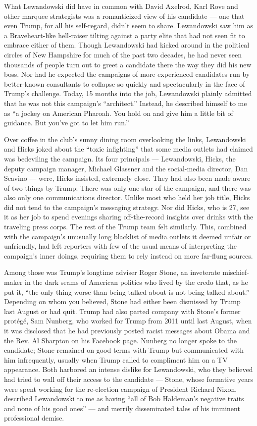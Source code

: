 What Lewandowski did have in common with David Axelrod, Karl Rove and
other marquee strategists was a romanticized view of his candidate ---
one that even Trump, for all his self-regard, didn't seem to share.
Lewandowski saw him as a Braveheart-like hell-raiser tilting against a
party elite that had not seen fit to embrace either of them. Though
Lewandowski had kicked around in the political circles of New Hampshire
for much of the past two decades, he had never seen thousands of people
turn out to greet a candidate there the way they did his new boss. Nor
had he expected the campaigns of more experienced candidates run by
better-known consultants to collapse so quickly and spectacularly in the
face of Trump's challenge. Today, 15 months into the job, Lewandowski
plainly admitted that he was not this campaign's ``architect.'' Instead,
he described himself to me as ``a jockey on American Pharoah. You hold
on and give him a little bit of guidance. But you've got to let him
run.''

Over coffee in the club's sunny dining room overlooking the links,
Lewandowski and Hicks joked about the ``toxic infighting'' that some
media outlets had claimed was bedeviling the campaign. Its four
principals --- Lewandowski, Hicks, the deputy campaign manager, Michael
Glassner and the social-media director, Dan Scavino --- were, Hicks
insisted, extremely close. They had also been made aware of two things
by Trump: There was only one star of the campaign, and there was also
only one communications director. Unlike most who held her job title,
Hicks did not tend to the campaign's messaging strategy. Nor did Hicks,
who is 27, see it as her job to spend evenings sharing off-the-record
insights over drinks with the traveling press corps. The rest of the
Trump team felt similarly. This, combined with the campaign's unusually
long blacklist of media outlets it deemed unfair or unfriendly, had left
reporters with few of the usual means of interpreting the campaign's
inner doings, requiring them to rely instead on more far-flung sources.

Among those was Trump's longtime adviser Roger Stone, an inveterate
mischief-maker in the dark seams of American politics who lived by the
credo that, as he put it, ``the only thing worse than being talked about
is not being talked about.'' Depending on whom you believed, Stone had
either been dismissed by Trump last August or had quit. Trump had also
parted company with Stone's former protégé, Sam Nunberg, who worked for
Trump from 2011 until last August, when it was disclosed that he had
previously posted racist messages about Obama and the Rev. Al Sharpton
on his Facebook page. Nunberg no longer spoke to the candidate; Stone
remained on good terms with Trump but communicated with him
infrequently, usually when Trump called to compliment him on a TV
appearance. Both harbored an intense dislike for Lewandowski, who they
believed had tried to wall off their access to the candidate --- Stone,
whose formative years were spent working for the re-election campaign of
President Richard Nixon, described Lewandowski to me as having ``all of
Bob Haldeman's negative traits and none of his good ones'' --- and
merrily disseminated tales of his imminent professional demise.

